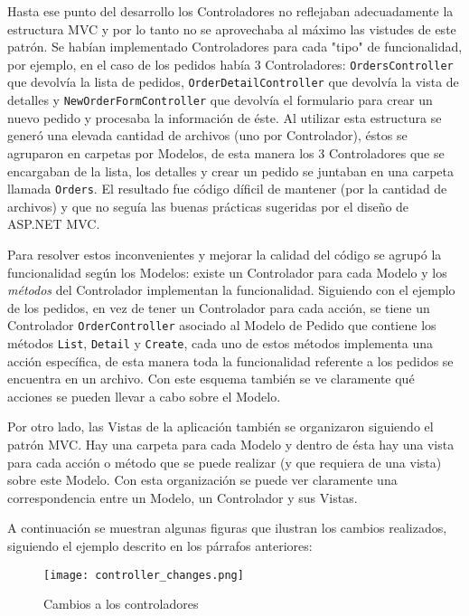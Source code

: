 Hasta ese punto del desarrollo los Controladores no reflejaban adecuadamente la estructura MVC y por lo tanto no se aprovechaba al máximo las vistudes de este patrón. Se habían implementado Controladores para cada "tipo" de funcionalidad, por ejemplo, en el caso de los pedidos había 3 Controladores: \texttt{OrdersController} que devolvía la lista de pedidos, \texttt{OrderDetailController} que devolvía la vista de detalles y \texttt{NewOrderFormContro\-ller} que devolvía el formulario para crear un nuevo pedido y procesaba la información de éste. Al utilizar esta estructura se generó una elevada cantidad de archivos (uno por Controlador), éstos se agruparon en carpetas por Modelos, de esta manera los 3 Controladores que se encargaban de la lista, los detalles y crear un pedido se juntaban en una carpeta llamada \texttt{Orders}. El resultado fue código díficil de mantener (por la cantidad de archivos) y que no seguía las buenas prácticas sugeridas por el diseño de ASP.NET MVC.

Para resolver estos inconvenientes y mejorar la calidad del código se agrupó la funcionalidad según los Modelos: existe un Controlador para cada Modelo y los \emph{métodos} del Controlador implementan la funcionalidad. Siguiendo con el ejemplo de los pedidos, en vez de tener un Controlador para cada acción, se tiene un Controlador \texttt{OrderController} asociado al Modelo de Pedido que contiene los métodos \texttt{List}, \texttt{Detail} y \texttt{Create}, cada uno de estos métodos implementa una acción específica, de esta manera toda la funcionalidad referente a los pedidos se encuentra en un archivo. Con este esquema también se ve claramente qué acciones se pueden llevar a cabo sobre el Modelo.

Por otro lado, las Vistas de la aplicación también se organizaron siguiendo el patrón MVC. Hay una carpeta para cada Modelo y dentro de ésta hay una vista para cada acción o método que se puede realizar (y que requiera de una vista) sobre este Modelo. Con esta organización se puede ver claramente una correspondencia entre un Modelo, un Controlador y sus Vistas.

A continuación se muestran algunas figuras que ilustran los cambios realizados, siguiendo el ejemplo descrito en los párrafos anteriores:

\begin{figure}[H]
    \centering
    \texttt{[image: controller\_changes.png]}
    \caption{Cambios a los controladores}
    \label{fig:controller_changes}
\end{figure}

